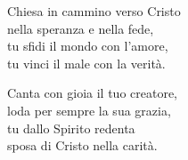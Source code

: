 \spazio

\strofa Chiesa in cammino verso Cristo\\
nella speranza e nella fede,\\
tu sfidi il mondo con l'amore,\\
tu vinci il male con la verità.

\spazio

Canta con gioia il tuo creatore,\\
loda per sempre la sua grazia,\\
tu dallo Spirito redenta\\
sposa di Cristo nella carità.

\spazio


